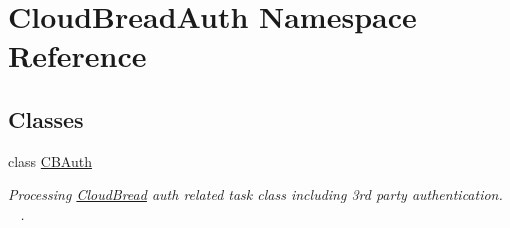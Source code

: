 \hypertarget{a00222}{}\section{Cloud\+Bread\+Auth Namespace Reference}
\label{a00222}
\subsection*{Classes}
\begin{DoxyCompactItemize}
\item 
class \hyperlink{a00009}{C\+B\+Auth}
\begin{DoxyCompactList}\small\item\em Processing \hyperlink{a00217}{Cloud\+Bread} auth related task class including 3rd party authentication. ~\newline
. \end{DoxyCompactList}\end{DoxyCompactItemize}
